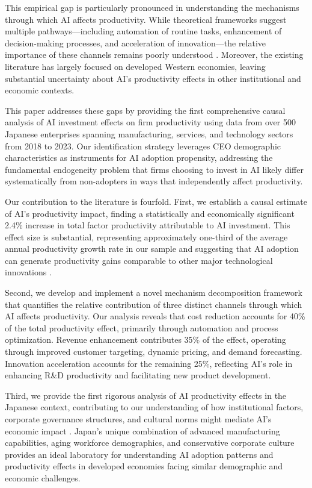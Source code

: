 \documentclass[12pt]{article}
\begin{document}
This empirical gap is particularly pronounced in understanding the mechanisms through which AI affects productivity. While theoretical frameworks suggest multiple pathways—including automation of routine tasks, enhancement of decision-making processes, and acceleration of innovation—the relative importance of these channels remains poorly understood \citep{brynjolfsson2019artificial, agrawal2018prediction}. Moreover, the existing literature has largely focused on developed Western economies, leaving substantial uncertainty about AI's productivity effects in other institutional and economic contexts.

This paper addresses these gaps by providing the first comprehensive causal analysis of AI investment effects on firm productivity using data from over 500 Japanese enterprises spanning manufacturing, services, and technology sectors from 2018 to 2023. Our identification strategy leverages CEO demographic characteristics as instruments for AI adoption propensity, addressing the fundamental endogeneity problem that firms choosing to invest in AI likely differ systematically from non-adopters in ways that independently affect productivity.

Our contribution to the literature is fourfold. First, we establish a causal estimate of AI's productivity impact, finding a statistically and economically significant 2.4\% increase in total factor productivity attributable to AI investment. This effect size is substantial, representing approximately one-third of the average annual productivity growth rate in our sample and suggesting that AI adoption can generate productivity gains comparable to other major technological innovations \citep{bresnahan1995general}.

Second, we develop and implement a novel mechanism decomposition framework that quantifies the relative contribution of three distinct channels through which AI affects productivity. Our analysis reveals that cost reduction accounts for 40\% of the total productivity effect, primarily through automation and process optimization. Revenue enhancement contributes 35\% of the effect, operating through improved customer targeting, dynamic pricing, and demand forecasting. Innovation acceleration accounts for the remaining 25\%, reflecting AI's role in enhancing R\&D productivity and facilitating new product development.

Third, we provide the first rigorous analysis of AI productivity effects in the Japanese context, contributing to our understanding of how institutional factors, corporate governance structures, and cultural norms might mediate AI's economic impact \citep{aoki2019japanese}. Japan's unique combination of advanced manufacturing capabilities, aging workforce demographics, and conservative corporate culture provides an ideal laboratory for understanding AI adoption patterns and productivity effects in developed economies facing similar demographic and economic challenges.
\end{document}
